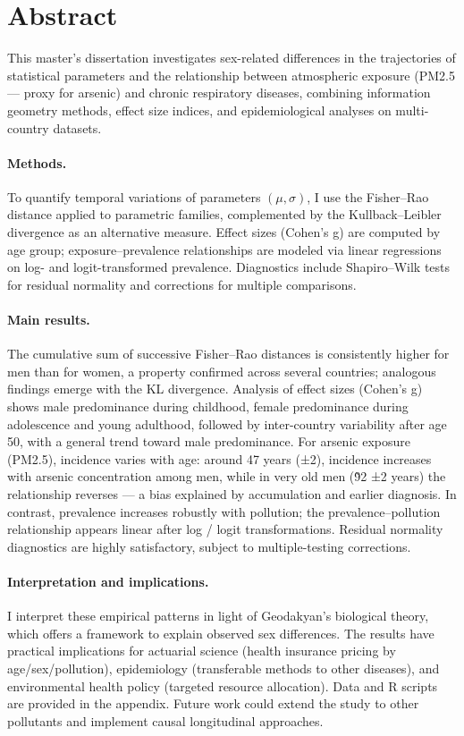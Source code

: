 \section{Abstract}

This master's dissertation investigates sex-related differences in the trajectories of statistical parameters and the relationship between atmospheric exposure (PM2.5 — proxy for arsenic) and chronic respiratory diseases, combining information geometry methods, effect size indices, and epidemiological analyses on multi-country datasets.

\paragraph{Methods.} To quantify temporal variations of parameters $(\mu,\sigma)$, I use the Fisher–Rao distance applied to parametric families, complemented by the Kullback–Leibler divergence as an alternative measure. Effect sizes (Cohen’s g) are computed by age group; exposure–prevalence relationships are modeled via linear regressions on log- and logit-transformed prevalence. Diagnostics include Shapiro–Wilk tests for residual normality and corrections for multiple comparisons.

\paragraph{Main results.} The cumulative sum of successive Fisher–Rao distances is consistently higher for men than for women, a property confirmed across several countries; analogous findings emerge with the KL divergence. Analysis of effect sizes (Cohen’s g) shows male predominance during childhood, female predominance during adolescence and young adulthood, followed by inter-country variability after age 50, with a general trend toward male predominance. For arsenic exposure (PM2.5), incidence varies with age: around 47 years (±2), incidence increases with arsenic concentration among men, while in very old men (\~92 ±2 years) the relationship reverses — a bias explained by accumulation and earlier diagnosis. In contrast, prevalence increases robustly with pollution; the prevalence–pollution relationship appears linear after log / logit transformations. Residual normality diagnostics are highly satisfactory, subject to multiple-testing corrections.

\paragraph{Interpretation and implications.} I interpret these empirical patterns in light of Geodakyan’s biological theory, which offers a framework to explain observed sex differences. The results have practical implications for actuarial science (health insurance pricing by age/sex/pollution), epidemiology (transferable methods to other diseases), and environmental health policy (targeted resource allocation). Data and R scripts are provided in the appendix. Future work could extend the study to other pollutants and implement causal longitudinal approaches.
